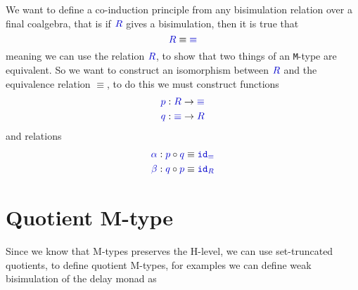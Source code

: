 \documentclass[twoside,11pt,openright]{report}
\newcommand*{\term}[1]{\textcolor{blue!80!black}{#1}}
\begin{document}
\\ \\
We want to define a co-induction principle from any bisimulation relation over a final coalgebra, that is if \(\term{R}\) gives a bisimulation, then it is true that
\begin{equation}
  \term{R} \equiv \term{\equiv}
\end{equation}
meaning we can use the relation \(\term{R}\), to show that two things of an \texttt{M}-type are equivalent. So we want to construct an isomorphism between \(\term{R}\) and the equivalence relation \(\equiv\), to do this we must construct functions
\begin{align}
  \term{p} &: \term{R} \rightarrow \term{\equiv} \\
  \term{q} &: \term{\equiv} \rightarrow \term{R}
\end{align}
and relations
\begin{align}
  \term{\alpha} &: \term{p} \circ \term{q} \equiv \term{\mathtt{id}_{\equiv}} \\
  \term{\beta} &: \term{q} \circ \term{p} \equiv \term{\mathtt{id}_{R}}
\end{align}

\section{Quotient M-type}
Since we know that M-types preserves the H-level, we can use set-truncated quotients, to define quotient M-types, for examples we can define weak bisimulation of the delay monad as
\end{document}
